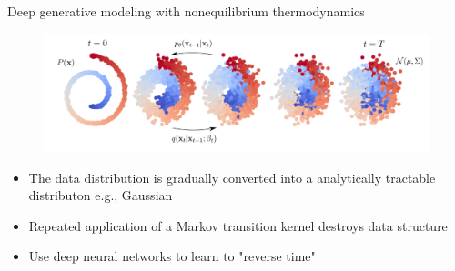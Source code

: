 \documentclass{beamer}					%
\begin{document}
\begin{frame}{Deep generative modeling with nonequilibrium thermodynamics}
\begin{figure}
\includegraphics[width=12cm]{DiffusionSwiss.png}
\end{figure}
\begin{itemize}
\item The data distribution is gradually converted into a analytically tractable distributon e.g., Gaussian
\item Repeated application of a Markov transition kernel destroys data structure
\item Use deep neural networks to learn to "reverse time"
\end{itemize}
\end{frame}
\end{document}
